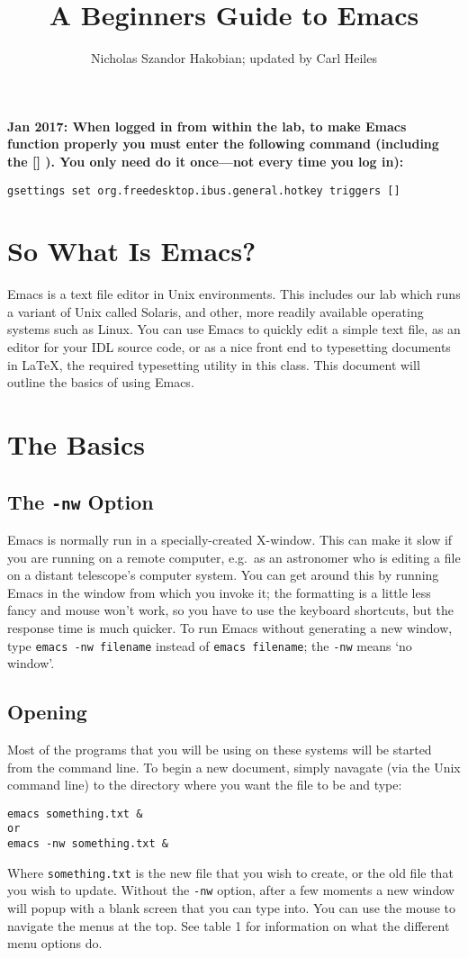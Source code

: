 \documentclass[preprint]{aastex}
\begin{document}
\setlength{\parskip}{0.02in}

\title{A Beginners Guide to Emacs}

\author{Nicholas Szandor Hakobian; updated by Carl Heiles}

{\bf Jan 2017: When logged in from within the lab, to make Emacs
  function properly you must enter the following command (including the
  [] ). You only need do it once---not every time you log in):}

{\tt gsettings set org.freedesktop.ibus.general.hotkey triggers []}


\section{So What Is Emacs?}
Emacs is a text file editor in Unix environments. This includes our
lab which runs a variant of Unix called Solaris, and other, more
readily available operating systems such as Linux. You can use Emacs
to quickly edit a simple text file, as an editor for your IDL source
code, or as a nice front end to typesetting documents in \LaTeX, the
required typesetting utility in this class. This document will outline
the basics of using Emacs.

\section{The Basics}

\subsection{The {\tt -nw} Option}
Emacs is normally run in a specially-created X-window. This can make it
slow if you are running on a remote computer, e.g.\ as an astronomer who
is editing a file on a distant telescope's computer system. You can get
around this by running Emacs in the window from which you invoke it; the
formatting is a little less fancy and mouse won't work, so you have to
use the keyboard shortcuts, but the response time is much quicker. To
run Emacs without generating a new window, type {\tt emacs -nw filename}
instead of {\tt emacs filename}; the {\tt -nw} means `no window'.

\subsection{Opening}
Most of the programs that you will be using on these systems will be
started from the command line. To begin a new document, simply
navagate (via the Unix command line) to the directory where you want
the file to be and type: 
\begin{verbatim}
emacs something.txt &
or
emacs -nw something.txt &
\end{verbatim}
Where {\tt something.txt} is the new file that you wish to create, or
the old file that you wish to update. Without the {\tt -nw} option,
after a few moments a new window will popup with a blank screen that you
can type into. You can use the mouse to navigate the menus at the
top. See table 1 for information on what the different menu options do.
\end{document}
